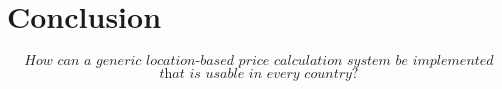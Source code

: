 \graphicspath{{Chapter7/Figs/Vector/}{Chapter7/Figs/}}

%
\chapter{Conclusion}
\[\textit{How can a generic location-based price calculation system be implemented}\]
\[\textit{that is usable in every country?}\] \hfill

